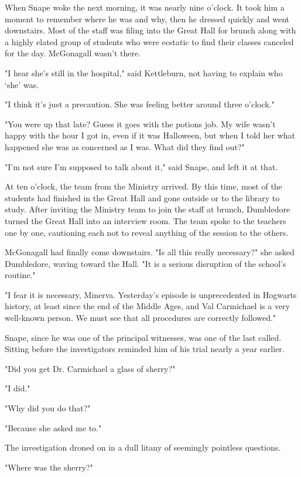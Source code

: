 When Snape woke the next morning, it was nearly nine o'clock. It took him a moment to remember where he was and why, then he dressed quickly and went downstairs. Most of the staff was filing into the Great Hall for brunch along with a highly elated group of students who were ecstatic to find their classes canceled for the day. McGonagall wasn't there.

"I hear she's still in the hospital," said Kettleburn, not having to explain who `she' was.

"I think it's just a precaution. She was feeling better around three o'clock."

"You were up that late? Guess it goes with the potions job. My wife wasn't happy with the hour I got in, even if it was Halloween, but when I told her what happened she was as concerned as I was. What did they find out?"

"I'm not sure I'm supposed to talk about it," said Snape, and left it at that.

At ten o'clock, the team from the Ministry arrived. By this time, most of the students had finished in the Great Hall and gone outside or to the library to study. After inviting the Ministry team to join the staff at brunch, Dumbledore turned the Great Hall into an interview room. The team spoke to the teachers one by one, cautioning each not to reveal anything of the session to the others.

McGonagall had finally come downstairs. "Is all this really necessary?" she asked Dumbledore, waving toward the Hall. "It is a serious disruption of the school's routine."

"I fear it is necessary, Minerva. Yesterday's episode is unprecedented in Hogwarts history, at least since the end of the Middle Ages, and Val Carmichael is a very well-known person. We must see that all procedures are correctly followed."

Snape, since he was one of the principal witnesses, was one of the last called. Sitting before the investigators reminded him of his trial nearly a year earlier.

"Did you get Dr. Carmichael a glass of sherry?"

"I did."

"Why did you do that?"

"Because she asked me to."

The investigation droned on in a dull litany of seemingly pointless questions.

"Where was the sherry?"

